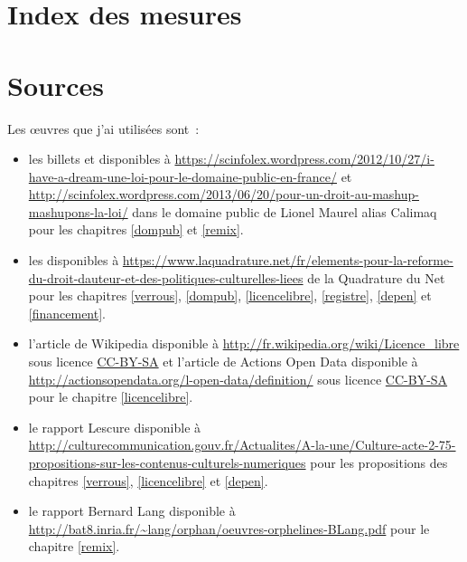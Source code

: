 \chapter{Index des mesures}\label{index}


\chapter{Sources}


Les œuvres que j'ai utilisées sont~:

\begin{itemize}
\item les billets  et  disponibles à \url{https://scinfolex.wordpress.com/2012/10/27/i-have-a-dream-une-loi-pour-le-domaine-public-en-france/} et \url{http://scinfolex.wordpress.com/2013/06/20/pour-un-droit-au-mashup-mashupons-la-loi/} dans le domaine public de Lionel Maurel alias Calimaq pour les chapitres \ref{dompub} et \ref{remix}.
\item les  disponibles à \url{https://www.laquadrature.net/fr/elements-pour-la-reforme-du-droit-dauteur-et-des-politiques-culturelles-liees} de la Quadrature du Net pour les chapitres \ref{verrous}, \ref{dompub}, \ref{licencelibre}, \ref{registre}, \ref{depen} et \ref{financement}.
\item l'article  de Wikipedia disponible à \url{http://fr.wikipedia.org/wiki/Licence_libre} sous licence \href{http://creativecommons.org/licenses/by-sa/2.0/fr/}{CC-BY-SA} et l'article  de Actions Open Data disponible à \url{http://actionsopendata.org/l-open-data/definition/} sous licence \href{http://creativecommons.org/licenses/by-sa/2.0/fr/}{CC-BY-SA} pour le chapitre \ref{licencelibre}.
\item le rapport Lescure disponible à \url{http://culturecommunication.gouv.fr/Actualites/A-la-une/Culture-acte-2-75-propositions-sur-les-contenus-culturels-numeriques} pour les propositions des chapitres \ref{verrous}, \ref{licencelibre} et \ref{depen}.
\item le rapport Bernard Lang  disponible à \url{http://bat8.inria.fr/~lang/orphan/oeuvres-orphelines-BLang.pdf} pour le chapitre \ref{remix}.

\end{itemize}
